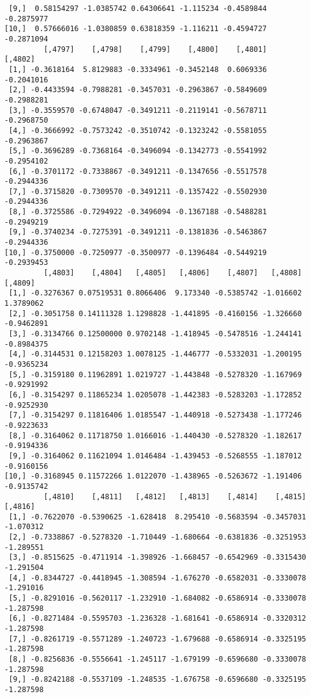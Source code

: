 \documentclass[
  letterpaper,
  DIV=11,
  numbers=noendperiod]{scrreprt}
\begin{document}
\begin{verbatim}
 [9,]  0.58154297 -1.0385742 0.64306641 -1.115234 -0.4589844 -0.2875977
[10,]  0.57666016 -1.0380859 0.63818359 -1.116211 -0.4594727 -0.2871094
         [,4797]    [,4798]    [,4799]    [,4800]    [,4801]    [,4802]
 [1,] -0.3618164  5.8129883 -0.3334961 -0.3452148  0.6069336 -0.2041016
 [2,] -0.4433594 -0.7988281 -0.3457031 -0.2963867 -0.5849609 -0.2988281
 [3,] -0.3559570 -0.6748047 -0.3491211 -0.2119141 -0.5678711 -0.2968750
 [4,] -0.3666992 -0.7573242 -0.3510742 -0.1323242 -0.5581055 -0.2963867
 [5,] -0.3696289 -0.7368164 -0.3496094 -0.1342773 -0.5541992 -0.2954102
 [6,] -0.3701172 -0.7338867 -0.3491211 -0.1347656 -0.5517578 -0.2944336
 [7,] -0.3715820 -0.7309570 -0.3491211 -0.1357422 -0.5502930 -0.2944336
 [8,] -0.3725586 -0.7294922 -0.3496094 -0.1367188 -0.5488281 -0.2949219
 [9,] -0.3740234 -0.7275391 -0.3491211 -0.1381836 -0.5463867 -0.2944336
[10,] -0.3750000 -0.7250977 -0.3500977 -0.1396484 -0.5449219 -0.2939453
         [,4803]    [,4804]   [,4805]   [,4806]    [,4807]   [,4808]    [,4809]
 [1,] -0.3276367 0.07519531 0.8066406  9.173340 -0.5385742 -1.016602  1.3789062
 [2,] -0.3051758 0.14111328 1.1298828 -1.441895 -0.4160156 -1.326660 -0.9462891
 [3,] -0.3134766 0.12500000 0.9702148 -1.418945 -0.5478516 -1.244141 -0.8984375
 [4,] -0.3144531 0.12158203 1.0078125 -1.446777 -0.5332031 -1.200195 -0.9365234
 [5,] -0.3159180 0.11962891 1.0219727 -1.443848 -0.5278320 -1.167969 -0.9291992
 [6,] -0.3154297 0.11865234 1.0205078 -1.442383 -0.5283203 -1.172852 -0.9252930
 [7,] -0.3154297 0.11816406 1.0185547 -1.440918 -0.5273438 -1.177246 -0.9223633
 [8,] -0.3164062 0.11718750 1.0166016 -1.440430 -0.5278320 -1.182617 -0.9194336
 [9,] -0.3164062 0.11621094 1.0146484 -1.439453 -0.5268555 -1.187012 -0.9160156
[10,] -0.3168945 0.11572266 1.0122070 -1.438965 -0.5263672 -1.191406 -0.9135742
         [,4810]    [,4811]   [,4812]   [,4813]    [,4814]    [,4815]   [,4816]
 [1,] -0.7622070 -0.5390625 -1.628418  8.295410 -0.5683594 -0.3457031 -1.070312
 [2,] -0.7338867 -0.5278320 -1.710449 -1.680664 -0.6381836 -0.3251953 -1.289551
 [3,] -0.8515625 -0.4711914 -1.398926 -1.668457 -0.6542969 -0.3315430 -1.291504
 [4,] -0.8344727 -0.4418945 -1.308594 -1.676270 -0.6582031 -0.3330078 -1.291016
 [5,] -0.8291016 -0.5620117 -1.232910 -1.684082 -0.6586914 -0.3330078 -1.287598
 [6,] -0.8271484 -0.5595703 -1.236328 -1.681641 -0.6586914 -0.3320312 -1.287598
 [7,] -0.8261719 -0.5571289 -1.240723 -1.679688 -0.6586914 -0.3325195 -1.287598
 [8,] -0.8256836 -0.5556641 -1.245117 -1.679199 -0.6596680 -0.3330078 -1.287598
 [9,] -0.8242188 -0.5537109 -1.248535 -1.676758 -0.6596680 -0.3325195 -1.287598

\end{verbatim}
\end{document}
